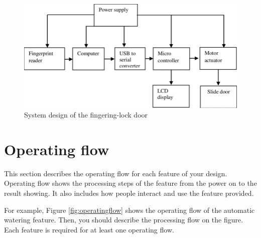\documentclass[12pt]{report}
\begin{document}
	\begin{figure}[ht]
		\begin{center}
			\includegraphics[width=\textwidth]{SystemDesign.png}
			\caption{System design of the fingering-lock door}\label{fig:systemdesign}
		\end{center}
	\end{figure}
	
	
	
	\section{Operating flow}
	This section describes the operating flow for each feature of your design.
	Operating flow shows the processing steps of the feature from the power on to the result showing.
	It also includes how people interact and use the feature provided.
	
	For example,
	Figure \ref{fig:operatingflow} shows the operating flow of the automatic watering feature.
	Then, you should describe the processing flow on the figure.
	Each feature is required for at least one operating flow.
	
\end{document}
